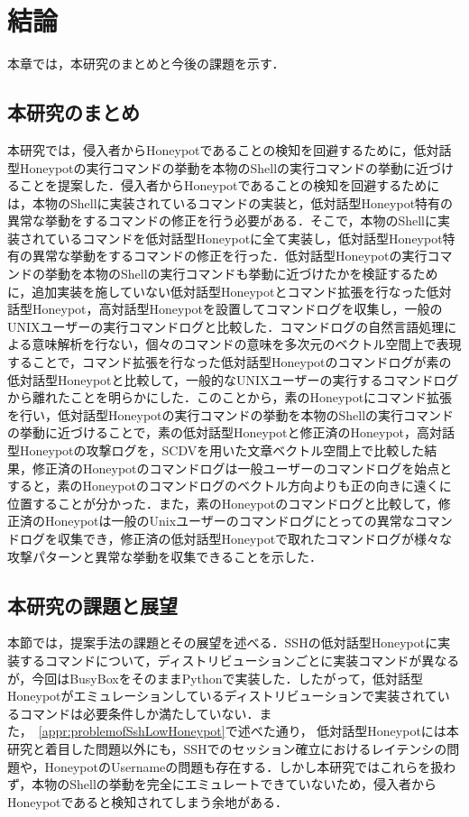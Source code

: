 \chapter{結論}
\label{conc}

本章では，本研究のまとめと今後の課題を示す．

\section{本研究のまとめ}

本研究では，侵入者からHoneypotであることの検知を回避するために，低対話型Honeypotの実行コマンドの挙動を本物のShellの実行コマンドの挙動に近づけることを提案した．侵入者からHoneypotであることの検知を回避するためには，本物のShellに実装されているコマンドの実装と，低対話型Honeypot特有の異常な挙動をするコマンドの修正を行う必要がある．そこで，本物のShellに実装されているコマンドを低対話型Honeypotに全て実装し，低対話型Honeypot特有の異常な挙動をするコマンドの修正を行った．低対話型Honeypotの実行コマンドの挙動を本物のShellの実行コマンドも挙動に近づけたかを検証するために，追加実装を施していない低対話型Honeypotとコマンド拡張を行なった低対話型Honeypot，高対話型Honeypotを設置してコマンドログを収集し，一般のUNIXユーザーの実行コマンドログと比較した．コマンドログの自然言語処理による意味解析を行ない，個々のコマンドの意味を多次元のベクトル空間上で表現することで，コマンド拡張を行なった低対話型Honeypotのコマンドログが素の低対話型Honeypotと比較して，一般的なUNIXユーザーの実行するコマンドログから離れたことを明らかにした．このことから，素のHoneypotにコマンド拡張を行い，低対話型Honeypotの実行コマンドの挙動を本物のShellの実行コマンドの挙動に近づけることで，素の低対話型Honeypotと修正済のHoneypot，高対話型Honeypotの攻撃ログを，SCDVを用いた文章ベクトル空間上で比較した結果，修正済のHoneypotのコマンドログは一般ユーザーのコマンドログを始点とすると，素のHoneypotのコマンドログのベクトル方向よりも正の向きに遠くに位置することが分かった．また，素のHoneypotのコマンドログと比較して，修正済のHoneypotは一般のUnixユーザーのコマンドログにとっての異常なコマンドログを収集でき，修正済の低対話型Honeypotで取れたコマンドログが様々な攻撃パターンと異常な挙動を収集できることを示した．

\section{本研究の課題と展望}
本節では，提案手法の課題とその展望を述べる．SSHの低対話型Honeypotに実装するコマンドについて，ディストリビューションごとに実装コマンドが異なるが，今回はBusyBoxをそのままPythonで実装した．したがって，低対話型Honeypotがエミュレーションしているディストリビューションで実装されているコマンドは必要条件しか満たしていない．また，~\ref{appr:problemofSshLowHoneypot}で述べた通り，
低対話型Honeypotには本研究と着目した問題以外にも，SSHでのセッション確立におけるレイテンシの問題や，HoneypotのUsernameの問題も存在する．しかし本研究ではこれらを扱わず，本物のShellの挙動を完全にエミュレートできていないため，侵入者からHoneypotであると検知されてしまう余地がある．


